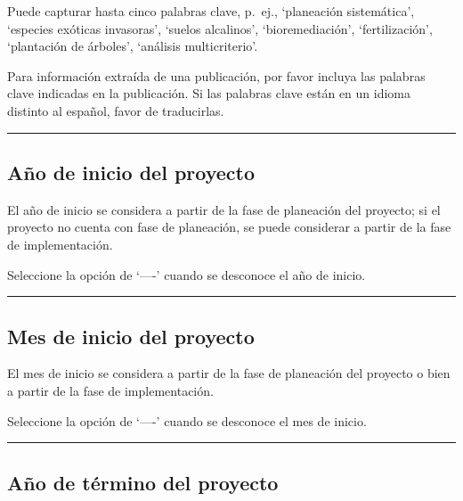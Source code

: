 \documentclass[
]{book}
\begin{document}
Puede capturar hasta cinco palabras clave, p.~ej., `planeación sistemática', `especies exóticas invasoras', `suelos alcalinos', `bioremediación', `fertilización', `plantación de árboles', `análisis multicriterio'.

Para información extraída de una publicación, por favor incluya las palabras clave indicadas en la publicación. Si las palabras clave están en un idioma distinto al español, favor de traducirlas.

\begin{center}\rule{0.5\linewidth}{0.5pt}\end{center}

\hypertarget{auxf1o-de-inicio-del-proyecto}{%
\subsection*{Año de inicio del proyecto}\label{auxf1o-de-inicio-del-proyecto}}

El año de inicio se considera a partir de la fase de planeación del proyecto; si el proyecto no cuenta con fase de planeación, se puede considerar a partir de la fase de implementación.

Seleccione la opción de `----' cuando se desconoce el año de inicio.

\begin{center}\rule{0.5\linewidth}{0.5pt}\end{center}

\hypertarget{mes-de-inicio-del-proyecto}{%
\subsection*{Mes de inicio del proyecto}\label{mes-de-inicio-del-proyecto}}

El mes de inicio se considera a partir de la fase de planeación del proyecto o bien a partir de la fase de implementación.

Seleccione la opción de `----' cuando se desconoce el mes de inicio.

\begin{center}\rule{0.5\linewidth}{0.5pt}\end{center}

\hypertarget{auxf1o-de-tuxe9rmino-del-proyecto}{%
\subsection*{Año de término del proyecto}\label{auxf1o-de-tuxe9rmino-del-proyecto}}
\end{document}
